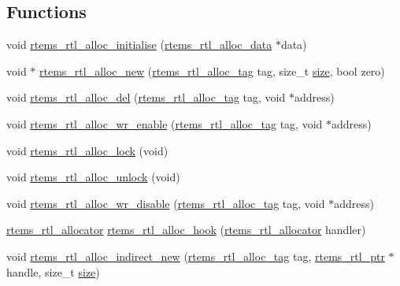 \subsection*{Functions}
\begin{DoxyCompactItemize}
\item 
void \mbox{\hyperlink{rtl-allocator_8c_a2d9522999ddb398520073cf010f6effe}{rtems\+\_\+rtl\+\_\+alloc\+\_\+initialise}} (\mbox{\hyperlink{structrtems__rtl__alloc__data}{rtems\+\_\+rtl\+\_\+alloc\+\_\+data}} $\ast$data)
\item 
void $\ast$ \mbox{\hyperlink{rtl-allocator_8c_afddd36f9f551ae6646028bcc78f3a6dd}{rtems\+\_\+rtl\+\_\+alloc\+\_\+new}} (\mbox{\hyperlink{rtl-allocator_8h_a445a8615118b7fc14005ab20583153fd}{rtems\+\_\+rtl\+\_\+alloc\+\_\+tag}} tag, size\+\_\+t \mbox{\hyperlink{sun4u_2tte_8h_a245260f6f74972558f61b85227df5aae}{size}}, bool zero)
\item 
void \mbox{\hyperlink{rtl-allocator_8c_a53995705cd080120f3755af859d7cc50}{rtems\+\_\+rtl\+\_\+alloc\+\_\+del}} (\mbox{\hyperlink{rtl-allocator_8h_a445a8615118b7fc14005ab20583153fd}{rtems\+\_\+rtl\+\_\+alloc\+\_\+tag}} tag, void $\ast$address)
\item 
void \mbox{\hyperlink{rtl-allocator_8c_a4453db077482ecf6647ce38e2381c45c}{rtems\+\_\+rtl\+\_\+alloc\+\_\+wr\+\_\+enable}} (\mbox{\hyperlink{rtl-allocator_8h_a445a8615118b7fc14005ab20583153fd}{rtems\+\_\+rtl\+\_\+alloc\+\_\+tag}} tag, void $\ast$address)
\item 
void \mbox{\hyperlink{rtl-allocator_8c_aca4dbc8b7c392bb60b9aa241f23773e5}{rtems\+\_\+rtl\+\_\+alloc\+\_\+lock}} (void)
\item 
void \mbox{\hyperlink{rtl-allocator_8c_a172d5d28306660657ae5cd4e1b39ecfc}{rtems\+\_\+rtl\+\_\+alloc\+\_\+unlock}} (void)
\item 
void \mbox{\hyperlink{rtl-allocator_8c_a97d8fccb913b102e6d102cc86431ad64}{rtems\+\_\+rtl\+\_\+alloc\+\_\+wr\+\_\+disable}} (\mbox{\hyperlink{rtl-allocator_8h_a445a8615118b7fc14005ab20583153fd}{rtems\+\_\+rtl\+\_\+alloc\+\_\+tag}} tag, void $\ast$address)
\item 
\mbox{\hyperlink{rtl-allocator_8h_aa8af44a7337cfbfe72b669c82a604bb7}{rtems\+\_\+rtl\+\_\+allocator}} \mbox{\hyperlink{rtl-allocator_8c_a33521c77270f8bcfc8b5bfd61cd8ab0c}{rtems\+\_\+rtl\+\_\+alloc\+\_\+hook}} (\mbox{\hyperlink{rtl-allocator_8h_aa8af44a7337cfbfe72b669c82a604bb7}{rtems\+\_\+rtl\+\_\+allocator}} handler)
\item 
void \mbox{\hyperlink{rtl-allocator_8c_a0c6d91e7ac73cef0b5c4d91230766fb9}{rtems\+\_\+rtl\+\_\+alloc\+\_\+indirect\+\_\+new}} (\mbox{\hyperlink{rtl-allocator_8h_a445a8615118b7fc14005ab20583153fd}{rtems\+\_\+rtl\+\_\+alloc\+\_\+tag}} tag, \mbox{\hyperlink{structrtems__rtl__ptr}{rtems\+\_\+rtl\+\_\+ptr}} $\ast$handle, size\+\_\+t \mbox{\hyperlink{sun4u_2tte_8h_a245260f6f74972558f61b85227df5aae}{size}})

\end{DoxyCompactItemize}

